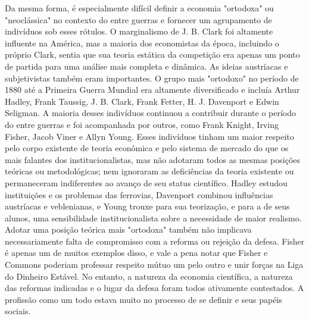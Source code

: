 \documentclass[12pt]{article}
\begin{document}
Da mesma forma, é especialmente difícil definir a economia "ortodoxa" ou "neoclássica" no contexto do entre guerras e fornecer um agrupamento de indivíduos sob esses rótulos. O marginalismo de J. B. Clark foi altamente influente na América, mas a maioria dos economistas da época, incluindo o próprio Clark, sentia que sua teoria estática da competição era apenas um ponto de partida para uma análise mais completa e dinâmica. As ideias austríacas e subjetivistas também eram importantes. O grupo mais "ortodoxo" no período de 1880 até a Primeira Guerra Mundial era altamente diversificado e incluía Arthur Hadley, Frank Taussig, J. B. Clark, Frank Fetter, H. J. Davenport e Edwin Seligman. A maioria desses indivíduos continuou a contribuir durante o período do entre guerras e foi acompanhada por outros, como Frank Knight, Irving Fisher, Jacob Viner e Allyn Young. Esses indivíduos tinham um maior respeito pelo corpo existente de teoria econômica e pelo sistema de mercado do que os mais falantes dos institucionalistas, mas não adotaram todos as mesmas posições teóricas ou metodológicas; nem ignoraram as deficiências da teoria existente ou permaneceram indiferentes ao avanço de seu status científico. Hadley estudou instituições e os problemas das ferrovias, Davenport combinou influências austríacas e veblenianas, e Young trouxe para sua teorização, e para a de seus alunos, uma sensibilidade institucionalista sobre a necessidade de maior realismo. Adotar uma posição teórica mais "ortodoxa" também não implicava necessariamente falta de compromisso com a reforma ou rejeição da defesa. Fisher é apenas um de muitos exemplos disso, e vale a pena notar que Fisher e Commons poderiam professar respeito mútuo um pelo outro e unir forças na Liga do Dinheiro Estável. No entanto, a natureza da economia científica, a natureza das reformas indicadas e o lugar da defesa foram todos ativamente contestados. A profissão como um todo estava muito no processo de se definir e seus papéis sociais.
\end{document}
